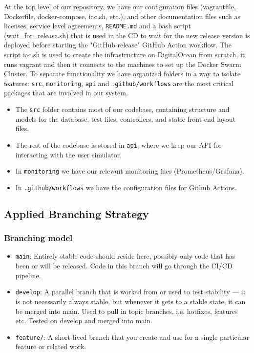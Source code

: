 At the top level of our repository, we have our configuration files (vagrantfile, Dockerfile, docker-compose, iac.sh, etc.), and other documentation files such as licenses, service level agreements, \texttt{README.md} and a bash script (wait\_for\_release.sh) that is used in the CD to wait for the new release version is deployed before starting the "GitHub release" GitHub Action workflow. The script iac.sh is used to create the infrastructure on DigitalOcean from scratch, it runs vagrant and then it connects to the machines to set up the Docker Swarm Cluster. To separate functionality we have organized folders in a way to isolate features: \texttt{src}, \texttt{monitoring}, \texttt{api} and \texttt{.github/workflows} are the most critical packages that are involved in our system. 
\begin{itemize}
    \item The \texttt{src} folder contains most of our codebase, containing structure and models for the database, test files, controllers, and static front-end layout files.
    \item The rest of the codebase is stored in \texttt{api}, where we keep our API for interacting with the user simulator.
    \item In \texttt{monitoring} we have our relevant monitoring files (Prometheus/Grafana).
    \item In \texttt{.github/workflows} we have the configuration files for Github Actions.
\end{itemize}

\subsection{Applied Branching Strategy}

\subsubsection*{Branching model}
\begin{itemize}
    \item \texttt{main}: Entirely stable code should reside here, possibly only code that has been or will be released. Code in this branch will go through the CI/CD pipeline.
    \item \texttt{develop}: A parallel branch that is worked from or used to test stability — it is not necessarily always stable, but whenever it gets to a stable state, it can be merged into main. Used to pull in topic branches, i.e. hotfixes, features etc. Tested on develop and merged into main.
    \item \texttt{feature/}: A short-lived branch that you create and use for a single particular feature or related work.
\end{itemize}


